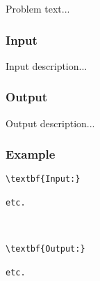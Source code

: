 

Problem text...

\subsubsection{Input}

Input description...

\subsubsection{Output}

Output description...

\subsubsection{Example}
\begin{verbatim}
\textbf{Input:}

etc.



\textbf{Output:}

etc.

\end{verbatim}